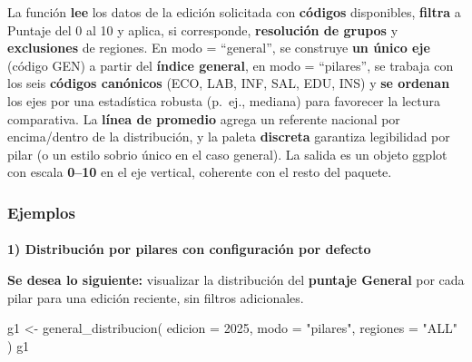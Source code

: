 \documentclass[
  11pt,
  letterpaper,
  DIV=11,
  numbers=noendperiod]{scrartcl}
\makeatletter
\let\oldparagraph\paragraph
\renewcommand{\paragraph}{
    \@ifstar
      \xxxParagraphStar
      \xxxParagraphNoStar
  }
\newcommand{\xxxParagraphStar}[1]{\oldparagraph*{#1}\mbox{}}
\newcommand{\xxxParagraphNoStar}[1]{\oldparagraph{#1}\mbox{}}
\newenvironment{Shaded}{\begin{snugshade}}{\end{snugshade}}
\newcommand{\AttributeTok}[1]{\textcolor[rgb]{0.40,0.45,0.13}{#1}}
\newcommand{\DecValTok}[1]{\textcolor[rgb]{0.68,0.00,0.00}{#1}}
\newcommand{\FunctionTok}[1]{\textcolor[rgb]{0.28,0.35,0.67}{#1}}
\newcommand{\NormalTok}[1]{\textcolor[rgb]{0.00,0.23,0.31}{#1}}
\newcommand{\OtherTok}[1]{\textcolor[rgb]{0.00,0.23,0.31}{#1}}
\newcommand{\StringTok}[1]{\textcolor[rgb]{0.13,0.47,0.30}{#1}}
\makeatother
\begin{document}
La función \textbf{lee} los datos de la edición solicitada con
\textbf{códigos} disponibles, \textbf{filtra} a Puntaje del 0 al 10 y
aplica, si corresponde, \textbf{resolución de grupos} y
\textbf{exclusiones} de regiones. En modo = ``general'', se construye
\textbf{un único eje} (código GEN) a partir del \textbf{índice general},
en modo = ``pilares'', se trabaja con los seis \textbf{códigos
canónicos} (ECO, LAB, INF, SAL, EDU, INS) y \textbf{se ordenan} los ejes
por una estadística robusta (p.~ej., mediana) para favorecer la lectura
comparativa. La \textbf{línea de promedio} agrega un referente nacional
por encima/dentro de la distribución, y la paleta \textbf{discreta}
garantiza legibilidad por pilar (o un estilo sobrio único en el caso
general). La salida es un objeto ggplot con escala \textbf{0--10} en el
eje vertical, coherente con el resto del paquete.

\subsubsection{\texorpdfstring{\textbf{Ejemplos}}{Ejemplos}}\label{ejemplos-3}

\paragraph{\texorpdfstring{\textbf{1) Distribución por pilares con
configuración por
defecto}}{1) Distribución por pilares con configuración por defecto}}\label{distribuciuxf3n-por-pilares-con-configuraciuxf3n-por-defecto}

\textbf{Se desea lo siguiente:} visualizar la distribución del
\textbf{puntaje General} por cada pilar para una edición reciente, sin
filtros adicionales.

\begin{Shaded}
\begin{Highlighting}[]
\NormalTok{g1 }\OtherTok{\textless{}{-}} \FunctionTok{general\_distribucion}\NormalTok{(}
  \AttributeTok{edicion =} \DecValTok{2025}\NormalTok{,}
  \AttributeTok{modo    =} \StringTok{"pilares"}\NormalTok{,}
  \AttributeTok{regiones =} \StringTok{"ALL"}
\NormalTok{)}
\NormalTok{g1}
\end{Highlighting}
\end{Shaded}
\end{document}
